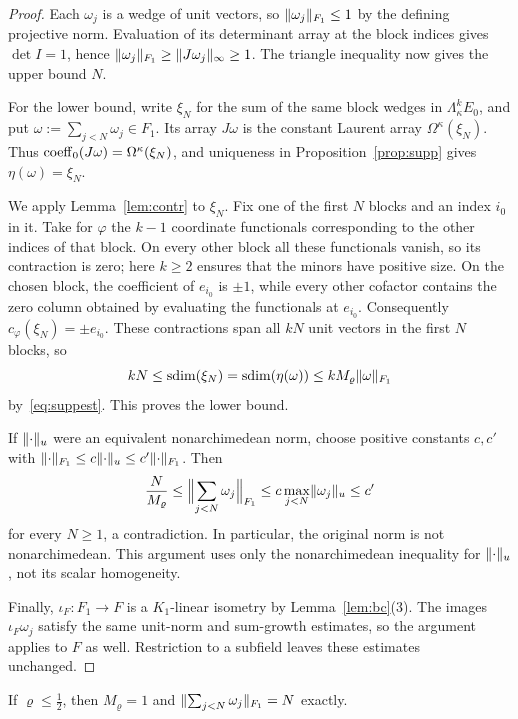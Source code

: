 \begin{proof}
Each $\omega_j$ is a wedge of unit vectors, so $\lVert \omega_j\rVert_{F_1}\le1$ by the defining projective norm. Evaluation
of its determinant array at the block indices gives $\det I=1$, hence
$\lVert \omega_j\rVert_{F_1}\ge\lVert J\omega_j\rVert_\infty\ge1$. The triangle inequality now gives the upper bound $N$.

For the lower bound, write $\xi_N$ for the sum of the same block wedges in $\Lambda^k_\kappa E_0$, and put
$\omega:=\sum_{j<N}\omega_j\in F_1$. Its array $J\omega$ is the constant Laurent array $\Omega^\kappa(\xi_N)$.
Thus $\operatorname{coeff}_0(J\omega)=\Omega^\kappa(\xi_N)$, and uniqueness in Proposition~\ref{prop:supp} gives
$\eta(\omega)=\xi_N$.

We apply Lemma~\ref{lem:contr} to $\xi_N$. Fix one of the first $N$ blocks and an index $i_0$ in it. Take for
$\varphi$ the $k-1$ coordinate functionals corresponding to the other indices of that block. On every other
block all these functionals vanish, so its contraction is zero; here $k\ge2$ ensures that the minors have
positive size. On the chosen block, the coefficient of $e_{i_0}$ is $\pm1$, while every other cofactor contains
the zero column obtained by evaluating the functionals at $e_{i_0}$. Consequently
$c_\varphi(\xi_N)=\pm e_{i_0}$. These contractions span all $kN$ unit vectors in the first $N$ blocks, so
\[
kN\le\operatorname{sdim}(\xi_N)=\operatorname{sdim}(\eta(\omega))\le kM_\varrho\lVert \omega\rVert_{F_1}
\]
by~\eqref{eq:suppest}. This proves the lower bound.

If $\lVert \cdot\rVert_u$ were an equivalent nonarchimedean norm, choose positive constants $c,c'$ with
$\lVert \cdot\rVert_{F_1}\le c\lVert \cdot\rVert_u\le c'\lVert \cdot\rVert_{F_1}$. Then
\[
\frac{N}{M_\varrho}\le\Bigl\lVert\sum_{j<N}\omega_j\Bigr\rVert_{F_1}
\le c\max_{j<N}\lVert \omega_j\rVert_u\le c'
\]
for every $N\ge1$, a contradiction. In particular, the original norm is not nonarchimedean. This argument uses
only the nonarchimedean inequality for $\lVert \cdot\rVert_u$, not its scalar homogeneity.

Finally, $\iota_F\colon F_1\to F$ is a $K_1$\nobreakdash-linear isometry by Lemma~\ref{lem:bc}(3). The images
$\iota_F\omega_j$ satisfy the same unit-norm and sum-growth estimates, so the argument applies to $F$ as well.
Restriction to a subfield leaves these estimates unchanged.
\end{proof}

If $\varrho\le\frac12$, then $M_\varrho=1$ and $\lVert \sum_{j<N}\omega_j\rVert_{F_1}=N$ exactly.

